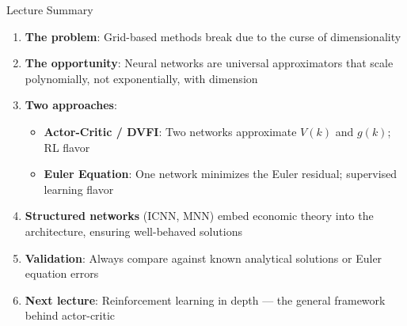 \documentclass[10pt,english,aspectratio=169]{beamer}
\begin{document}
\begin{frame}{Lecture Summary}
\begin{enumerate}
  \item \textbf{The problem}: Grid-based methods break due to the curse of dimensionality
  \medskip
  \item \textbf{The opportunity}: Neural networks are universal approximators that scale polynomially, not exponentially, with dimension
  \medskip
  \item \textbf{Two approaches}:
    \begin{itemize}
      \item \textbf{Actor-Critic / DVFI}: Two networks approximate $V(k)$ and $g(k)$; RL flavor
      \item \textbf{Euler Equation}: One network minimizes the Euler residual; supervised learning flavor
    \end{itemize}
  \medskip
  \item \textbf{Structured networks} (ICNN, MNN) embed economic theory into the architecture, ensuring well-behaved solutions
  \medskip
  \item \textbf{Validation}: Always compare against known analytical solutions or Euler equation errors
  \medskip
  \item \textbf{Next lecture}: Reinforcement learning in depth --- the general framework behind actor-critic
\end{enumerate}
\end{frame}
\end{document}
